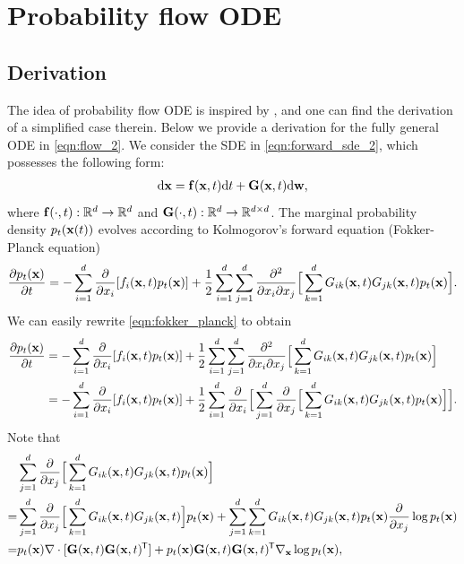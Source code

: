 \section{Probability flow ODE}\label{app:prob_flow_ode}
\subsection{Derivation}\label{app:prob_flow_derive}
The idea of probability flow ODE is inspired by \citet{maoutsa2020interacting}, and one can find the derivation of a simplified case therein. Below we provide a derivation for the fully general ODE in \cref{eqn:flow_2}. We consider the SDE in \cref{eqn:forward_sde_2}, which possesses the following form:
\begin{align*}
    \mathrm{d} \mathbf{x} = \mathbf{f}(\mathbf{x}, t) \mathrm{d} t + \mathbf{G}(\mathbf{x}, t) \mathrm{d} \mathbf{w},
\end{align*}
where $\mathbf{f}(\cdot, t): \mathbb{R}^d \to \mathbb{R}^d$ and $\mathbf{G}(\cdot, t): \mathbb{R}^d \to \mathbb{R}^{d\times d}$. The marginal probability density $p_t(\mathbf{x}(t))$ evolves according to Kolmogorov's forward equation (Fokker-Planck equation)~\citep{oksendal2003stochastic}
\begin{align}
    \frac{\partial p_t(\mathbf{x})}{\partial t} = -\sum_{i=1}^d \frac{\partial}{\partial x_i}[f_i(\mathbf{x}, t) p_t(\mathbf{x})] + \frac{1}{2}\sum_{i=1}^d\sum_{j=1}^d \frac{\partial^2}{\partial x_i \partial x_j}\Big[\sum_{k=1}^d G_{ik}(\mathbf{x}, t) G_{jk}(\mathbf{x}, t) p_t(\mathbf{x})\Big] \label{eqn:fokker_planck}.
\end{align}
We can easily rewrite \cref{eqn:fokker_planck} to obtain
\begin{align}
    \frac{\partial p_t(\mathbf{x})}{\partial t} &= -\sum_{i=1}^d \frac{\partial}{\partial x_i}[f_i(\mathbf{x}, t) p_t(\mathbf{x})] + \frac{1}{2}\sum_{i=1}^d\sum_{j=1}^d \frac{\partial^2}{\partial x_i \partial x_j}\Big[\sum_{k=1}^d G_{ik}(\mathbf{x}, t) G_{jk}(\mathbf{x}, t) p_t(\mathbf{x})\Big]\notag \\
    &= -\sum_{i=1}^d \frac{\partial}{\partial x_i}[f_i(\mathbf{x}, t) p_t(\mathbf{x})] + \frac{1}{2}\sum_{i=1}^d \frac{\partial}{\partial x_i} \Big[ \sum_{j=1}^d \frac{\partial}{\partial x_j}\Big[\sum_{k=1}^d G_{ik}(\mathbf{x}, t) G_{jk}(\mathbf{x}, t) p_t(\mathbf{x})\Big]\Big]. \label{eqn:ode_part_1}
\end{align}
Note that
\begin{align*}
    &\sum_{j=1}^d \frac{\partial}{\partial x_j}\Big[\sum_{k=1}^d G_{ik}(\mathbf{x}, t) G_{jk}(\mathbf{x}, t) p_t(\mathbf{x})\Big]\\
    =& \sum_{j=1}^d \frac{\partial}{\partial x_j} \Big[ \sum_{k=1}^d G_{ik}(\mathbf{x}, t) G_{jk}(\mathbf{x}, t) \Big] p_t(\mathbf{x}) + \sum_{j=1}^d \sum_{k=1}^d G_{ik}(\mathbf{x}, t)G_{jk}(\mathbf{x}, t) p_t(\mathbf{x}) \frac{\partial}{\partial x_j} \log p_t(\mathbf{x})\\
    =& p_t(\mathbf{x}) \nabla \cdot [\mathbf{G}(\mathbf{x}, t)\mathbf{G}(\mathbf{x}, t)^{\mkern-1.5mu\mathsf{T}}] + p_t(\mathbf{x}) \mathbf{G}(\mathbf{x}, t)\mathbf{G}(\mathbf{x}, t)^{\mkern-1.5mu\mathsf{T}} \nabla_{\mathbf{x}} \log p_t(\mathbf{x}),
\end{align*}
